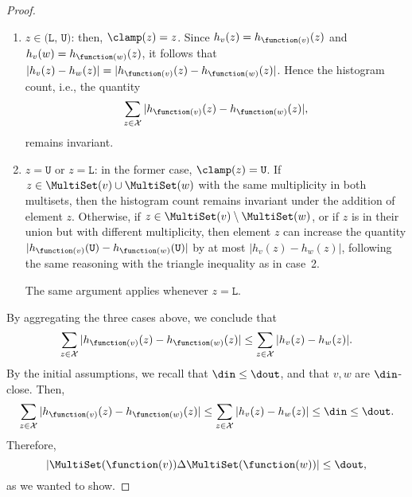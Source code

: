 \begin{proof}
\begin{enumerate}
    Suppose $z$ has multiplicity $k_v \geq 0$ in $\MultiSet(v)$ and multiplicity $k_w \geq 0$ in $\MultiSet(w)$, where $k_v \neq k_w$. After considering $z$, the value $h_{\function(v)}(\texttt{U})$ becomes $h_{\function(v)}(\texttt{U}) + k_v$, and $h_{\function(w)}(\texttt{U})$ becomes $h_{\function(w)}(\texttt{U}) + k_w$. Hence the quantity $|h_{\function(v)}(\texttt{U}) - h_{\function(w)}(\texttt{U})|$ increases by at most $|h_v(z) - h_w(z)|$, since, by the triangle inequality,
    \begin{align*}
         & |(h_{\function(v)}(\texttt{U}) + k_v) - (h_{\function(w)}(\texttt{U}) + k_w)| \leq
    \\[0.2cm]
         & \leq |h_{\function(v)}(\texttt{U}) - h_{\function(w)}(\texttt{U})| + |k_v - k_w| =
    \\[0.2cm]
        & = |h_{\function(v)}(\texttt{U}) - h_{\function(w)}(\texttt{U})| + |h_v(z) - h_w(z)|.
    \end{align*}
    The same argument applies whenever $z < \texttt{L}$.\footnote{The first subcase discussed here, i.e., when $k_v = k_w$, is also proven by the triangle inequality expression above, but it seemed clean to separate the case where the total sum remains invariant.}
    
    \item $z \in \texttt{(L, U)}$: then, $\clamp(z) = z$. Since $h_v(z) = h_{\function(v)}(z)$ and $h_v(w) = h_{\function(w)}(z)$, it follows that $|h_v(z) - h_w(z)| = |h_{\function(v)}(z) - h_{\function(w)}(z)|$. Hence the histogram count, i.e., the quantity
     \[
        \sum_{z \in \mathcal{X}} |h_{\function(v)}(z) - h_{\function(w)}(z)|,
    \]
    remains invariant.
    
    \item $z = \texttt{U}$ or $z = \texttt{L}$: in the former case, $\clamp(z) = \texttt{U}$. If $z \in \MultiSet(v) \cup \MultiSet(w)$ with the same multiplicity in both multisets, then the histogram count remains invariant under the addition of element $z$. Otherwise, if $z \in \MultiSet(v) \setminus \MultiSet(w)$, or if $z$ is in their union but with different multiplicity, then element $z$ can increase the quantity $|h_{\function(v)}(\texttt{U}) - h_{\function(w)}(\texttt{U})|$ by at most $|h_v(z)-h_w(z)|$, following the same reasoning with the triangle inequality as in case~2.
    
    The same argument applies whenever $z = \texttt{L}$.
\end{enumerate}

By aggregating the three cases above, we conclude that
\[
\sum_{z \in \mathcal{X}} |h_{\function(v)}(z) - h_{\function(w)}(z)| \leq \sum_{z \in \mathcal{X}} |h_v(z) - h_w(z)|.
\]
By the initial assumptions, we recall that $\din \leq \dout$, and that $v, w$ are $\din$-close. Then,
\[
\sum_{z \in \mathcal{X}} |h_{\function(v)}(z) - h_{\function(w)}(z)| \leq \sum_{z \in \mathcal{X}} |h_v(z) - h_w(z)| \leq \din \leq \dout.
\]
Therefore, 
\[
|\MultiSet(\function(v)) \Delta \MultiSet(\function(w))| \leq \dout,
\]
as we wanted to show.
\end{proof}


